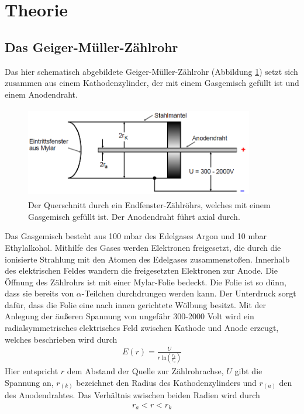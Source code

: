 \section{Theorie}
\subsection{Das Geiger-Müller-Zählrohr}
Das hier schematisch abgebildete Geiger-Müller-Zählrohr (Abbildung \ref{fig:Querschnitt}) setzt sich zusammen aus einem Kathodenzylinder, der mit einem Gasgemisch gefüllt ist und einem Anodendraht.
\begin{figure}[H]
\begin{center}
\includegraphics[width = 10cm, height= 4cm]{Querschnitt.png}
\caption{Der Querschnitt durch ein Endfenster-Zählröhrs, welches mit einem Gasgemisch gefüllt ist. Der Anodendraht führt axial durch.\protect\cite{AL}}
\end{center}
\label{fig:Querschnitt}
\end{figure}
\noindent
Das Gasgemisch besteht aus 100 mbar des Edelgases Argon und 10 mbar Ethylalkohol.
Mithilfe des Gases werden Elektronen freigesetzt, die durch die ionisierte Strahlung mit den Atomen des Edelgases zusammenstoßen.
Innerhalb des elektrischen Feldes wandern die freigesetzten Elektronen zur Anode.
Die Öffnung des Zählrohrs ist mit einer Mylar-Folie bedeckt.
Die Folie ist so dünn, dass sie bereits von $\alpha$-Teilchen durchdrungen werden kann.
Der Unterdruck sorgt dafür, dass die Folie eine nach innen gerichtete Wölbung besitzt.
Mit der Anlegung der äußeren Spannung von ungefähr 300-2000 Volt wird ein radialsymmetrisches elektrisches Feld zwischen Kathode und Anode erzeugt,
welches beschrieben wird durch
\begin{align}
    {E}({r}) = \frac{{U}}{{r} \ \text{ln}(\frac{{r}_{{k}}}{{r}_{{a}}})}
\end{align}
Hier entspricht $r$ dem Abstand der Quelle zur Zählrohrachse, $U$ gibt die Spannung an, $r_{(k)}$ bezeichnet den Radius des Kathodenzylinders und
$r_{(a)}$ den des Anodendrahtes.
Das Verhältnis zwischen beiden Radien wird durch
\begin{align}
  {r}_{{a}} < {r} < {r}_{{k}}
\end{align}
